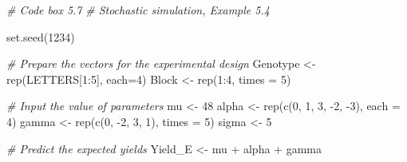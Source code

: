\documentclass[
  12pt,
]{book}
\newenvironment{Shaded}{\begin{snugshade}}{\end{snugshade}}
\newcommand{\AttributeTok}[1]{\textcolor[rgb]{0.77,0.63,0.00}{#1}}
\newcommand{\CommentTok}[1]{\textcolor[rgb]{0.56,0.35,0.01}{\textit{#1}}}
\newcommand{\DecValTok}[1]{\textcolor[rgb]{0.00,0.00,0.81}{#1}}
\newcommand{\FunctionTok}[1]{\textcolor[rgb]{0.00,0.00,0.00}{#1}}
\newcommand{\NormalTok}[1]{#1}
\newcommand{\OtherTok}[1]{\textcolor[rgb]{0.56,0.35,0.01}{#1}}
\newcommand{\SpecialCharTok}[1]{\textcolor[rgb]{0.00,0.00,0.00}{#1}}
\begin{document}
\begin{Shaded}
\begin{Highlighting}[]
\CommentTok{\# Code box 5.7}
\CommentTok{\# Stochastic simulation, Example 5.4}

\FunctionTok{set.seed}\NormalTok{(}\DecValTok{1234}\NormalTok{)}

\CommentTok{\# Prepare the vectors for the experimental design}
\NormalTok{Genotype }\OtherTok{\textless{}{-}} \FunctionTok{rep}\NormalTok{(LETTERS[}\DecValTok{1}\SpecialCharTok{:}\DecValTok{5}\NormalTok{], }\AttributeTok{each=}\DecValTok{4}\NormalTok{) }
\NormalTok{Block }\OtherTok{\textless{}{-}} \FunctionTok{rep}\NormalTok{(}\DecValTok{1}\SpecialCharTok{:}\DecValTok{4}\NormalTok{, }\AttributeTok{times =} \DecValTok{5}\NormalTok{)}

\CommentTok{\# Input the value of parameters}
\NormalTok{mu }\OtherTok{\textless{}{-}} \DecValTok{48}
\NormalTok{alpha }\OtherTok{\textless{}{-}} \FunctionTok{rep}\NormalTok{(}\FunctionTok{c}\NormalTok{(}\DecValTok{0}\NormalTok{, }\DecValTok{1}\NormalTok{, }\DecValTok{3}\NormalTok{, }\SpecialCharTok{{-}}\DecValTok{2}\NormalTok{, }\SpecialCharTok{{-}}\DecValTok{3}\NormalTok{), }\AttributeTok{each =} \DecValTok{4}\NormalTok{) }
\NormalTok{gamma }\OtherTok{\textless{}{-}} \FunctionTok{rep}\NormalTok{(}\FunctionTok{c}\NormalTok{(}\DecValTok{0}\NormalTok{, }\SpecialCharTok{{-}}\DecValTok{2}\NormalTok{, }\DecValTok{3}\NormalTok{, }\DecValTok{1}\NormalTok{), }\AttributeTok{times =} \DecValTok{5}\NormalTok{)}
\NormalTok{sigma }\OtherTok{\textless{}{-}} \DecValTok{5}

\CommentTok{\# Predict the expected yields}
\NormalTok{Yield\_E }\OtherTok{\textless{}{-}}\NormalTok{ mu }\SpecialCharTok{+}\NormalTok{ alpha }\SpecialCharTok{+}\NormalTok{ gamma}


\end{Highlighting}
\end{Shaded}
\end{document}
